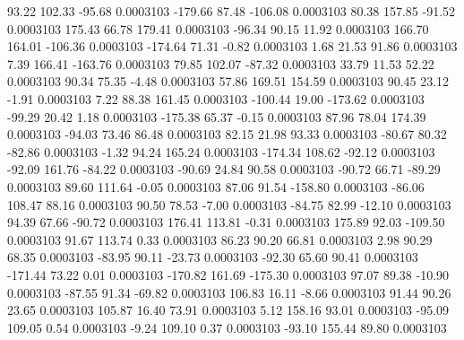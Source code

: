        93.22      102.33      -95.68     0.0003103
     -179.66       87.48     -106.08     0.0003103
       80.38      157.85      -91.52     0.0003103
      175.43       66.78      179.41     0.0003103
      -96.34       90.15       11.92     0.0003103
      166.70      164.01     -106.36     0.0003103
     -174.64       71.31       -0.82     0.0003103
        1.68       21.53       91.86     0.0003103
        7.39      166.41     -163.76     0.0003103
       79.85      102.07      -87.32     0.0003103
       33.79       11.53       52.22     0.0003103
       90.34       75.35       -4.48     0.0003103
       57.86      169.51      154.59     0.0003103
       90.45       23.12       -1.91     0.0003103
        7.22       88.38      161.45     0.0003103
     -100.44       19.00     -173.62     0.0003103
      -99.29       20.42        1.18     0.0003103
     -175.38       65.37       -0.15     0.0003103
       87.96       78.04      174.39     0.0003103
      -94.03       73.46       86.48     0.0003103
       82.15       21.98       93.33     0.0003103
      -80.67       80.32      -82.86     0.0003103
       -1.32       94.24      165.24     0.0003103
     -174.34      108.62      -92.12     0.0003103
      -92.09      161.76      -84.22     0.0003103
      -90.69       24.84       90.58     0.0003103
      -90.72       66.71      -89.29     0.0003103
       89.60      111.64       -0.05     0.0003103
       87.06       91.54     -158.80     0.0003103
      -86.06      108.47       88.16     0.0003103
       90.50       78.53       -7.00     0.0003103
      -84.75       82.99      -12.10     0.0003103
       94.39       67.66      -90.72     0.0003103
      176.41      113.81       -0.31     0.0003103
      175.89       92.03     -109.50     0.0003103
       91.67      113.74        0.33     0.0003103
       86.23       90.20       66.81     0.0003103
        2.98       90.29       68.35     0.0003103
      -83.95       90.11      -23.73     0.0003103
      -92.30       65.60       90.41     0.0003103
     -171.44       73.22        0.01     0.0003103
     -170.82      161.69     -175.30     0.0003103
       97.07       89.38      -10.90     0.0003103
      -87.55       91.34      -69.82     0.0003103
      106.83       16.11       -8.66     0.0003103
       91.44       90.26       23.65     0.0003103
      105.87       16.40       73.91     0.0003103
        5.12      158.16       93.01     0.0003103
      -95.09      109.05        0.54     0.0003103
       -9.24      109.10        0.37     0.0003103
      -93.10      155.44       89.80     0.0003103
